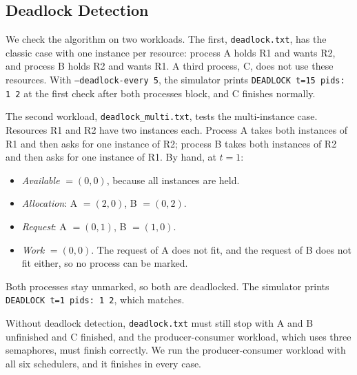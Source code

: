 \subsection{Deadlock Detection}
We check the algorithm on two workloads. The first, \texttt{deadlock.txt}, has the classic case with one instance per resource: process A holds R1 and wants R2, and process B holds R2 and wants R1. A third process, C, does not use these resources. With \texttt{--deadlock-every 5}, the simulator prints \texttt{DEADLOCK t=15 pids: 1 2} at the first check after both processes block, and C finishes normally.

The second workload, \texttt{deadlock\_multi.txt}, tests the multi-instance case. Resources R1 and R2 have two instances each. Process A takes both instances of R1 and then asks for one instance of R2; process B takes both instances of R2 and then asks for one instance of R1. By hand, at $t=1$:
\begin{itemize}
    \item \textit{Available} $= (0, 0)$, because all instances are held.
    \item \textit{Allocation}: A $= (2, 0)$, B $= (0, 2)$.
    \item \textit{Request}: A $= (0, 1)$, B $= (1, 0)$.
    \item \textit{Work} $= (0, 0)$. The request of A does not fit, and the request of B does not fit either, so no process can be marked.
\end{itemize}
Both processes stay unmarked, so both are deadlocked. The simulator prints \texttt{DEADLOCK t=1 pids: 1 2}, which matches.

Without deadlock detection, \texttt{deadlock.txt} must still stop with A and B unfinished and C finished, and the producer-consumer workload, which uses three semaphores, must finish correctly. We run the producer-consumer workload with all six schedulers, and it finishes in every case.
